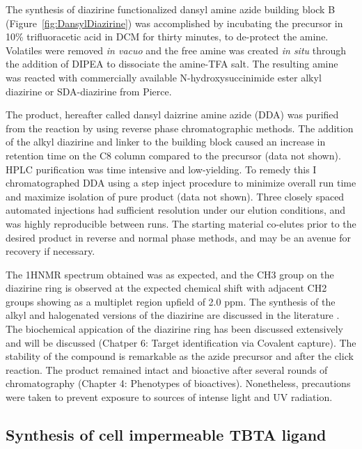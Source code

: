 The synthesis of diazirine functionalized dansyl amine azide building block B (Figure~\ref{fig:DansylDiazirine}) was accomplished by incubating the precursor in 10{\%} trifluoracetic acid in DCM for thirty minutes, to de-protect the amine. Volatiles were removed {\it in vacuo} and the free amine was created {\it in situ} \cite{kocienski2005protecting} through the addition of DIPEA to dissociate the amine-TFA salt. The resulting amine was reacted with commercially available N-hydroxysuccinimide ester alkyl diazirine or SDA-diazirine from Pierce.

The product, hereafter called dansyl daizrine amine azide (DDA) was purified from the reaction by using reverse phase chromatographic methods. The addition of the alkyl diazirine and linker to the building block caused an increase in retention time on the C8 column compared to the precursor (data not shown). HPLC purification was time intensive and low-yielding.  To remedy this I chromatographed DDA using a step inject procedure to minimize overall run time and maximize isolation of pure product (data not shown). Three closely spaced automated injections had sufficient resolution under our elution conditions, and was highly reproducible between runs. The starting material co-elutes prior to the desired product in reverse and normal phase methods, and may be an avenue for recovery if necessary.

The 1HNMR spectrum obtained was as expected, and the CH3 group on the diazirine ring is observed at the expected chemical shift with adjacent CH2 groups showing as a multiplet region upfield of 2.0 ppm. The synthesis of the alkyl and halogenated versions of the diazirine are discussed in the literature \cite{moss1995conversion,peptoids2010photoaffinity}\cite{mackinnon2007photo}. The biochemical appication of the diazirine ring has been discussed extensively \cite{work1979laboratory,bayley1983photogenerated} and will be discussed (Chatper 6: Target identification via Covalent capture). The stability of the compound is remarkable as the azide precursor and after the click reaction. The product remained intact and bioactive after several rounds of chromatography (Chapter 4: Phenotypes of bioactives). Nonetheless, precautions were taken to prevent exposure to sources of intense light and UV radiation.

\subsection{Synthesis of cell impermeable TBTA ligand}

